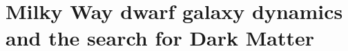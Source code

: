 \documentclass[11pt,a4paper,twoside,onecolumn,openany,final,oldfontcommands]{memoir}
\begin{document}







\section{Milky Way dwarf galaxy dynamics and the search for Dark Matter}
\end{document}
